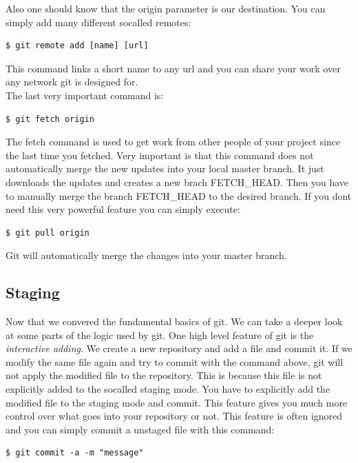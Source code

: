 Also one should know that the origin parameter is our destination. You can
simply add many different socalled remotes:

\begin{lstlisting}
$ git remote add [name] [url]
\end{lstlisting}

This command links a short name to any url and you can share your
work over any network git is designed for. \cite[Chapter 2.9]{gitpro2009}  \\

The last very important command is:
\begin{lstlisting}
$ git fetch origin
\end{lstlisting}

The fetch command is used to get work from other people of your project since
the last time you fetched. Very important is that this command does not
automatically merge the new updates into your local master branch. It just
downloads the updates and creates a new brach FETCH\_HEAD. Then you have to
manually merge the branch FETCH\_HEAD to the desired branch. 
If you dont need this very powerful feature you can simply execute:
\begin{lstlisting}
$ git pull origin
\end{lstlisting}
Git will automatically merge the changes into your master branch.
\cite[Chapter 2.9]{gitpro2009} \\

\subsection {Staging}

Now that we convered the fundamental basics of git. We can take a deeper look at
some parts of the logic used by git. One high level feature of git is the
\emph{interactive adding}. We create a new repository and add a file and commit
it. If we modify the same file again and try to commit with the command above,
git will not apply the modified file to the repository. This is because this file is
not explicitly added to the socalled staging mode. You have to explicitly add
the modified file to the staging mode and commit. This feature gives you much
more control over what goes into your repository or not. This feature is often
ignored and you can simply commit a unstaged file with this command:

\begin{lstlisting}
$ git commit -a -m "message"
\end{lstlisting}

